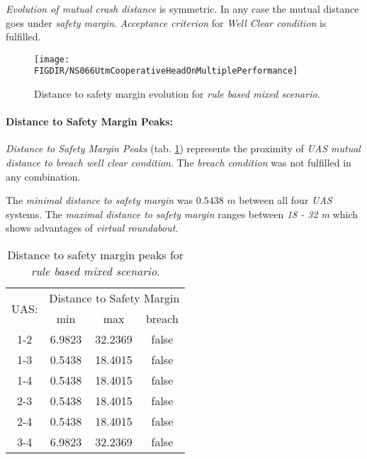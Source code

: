     \begin{note}
        \emph{Evolution of mutual crash distance} is symmetric. In any case the mutual distance goes under \emph{safety margin}. \emph{Acceptance criterion} for \emph{Well Clear condition} is fulfilled.
    \end{note}
        
    \begin{figure}[H]
        \centering
        \texttt{[image: \\FIGDIR/NS066UtmCooperativeHeadOnMultiplePerformance]}
        \caption{Distance to safety margin evolution for \emph{rule based mixed scenario}.}
        \label{fig:testRuleBasedMultipleAvoidancePerformance}
    \end{figure}
    
\paragraph{Distance to Safety Margin Peaks:} \emph{Distance to Safety Margin Peaks} (tab. \ref{tab:testCaseRuleBasedMixedSafetyMarginDistances}) represents the proximity of \emph{UAS mutual distance to breach well clear condition}. The \emph{breach condition} was not fulfilled in any combination. 
    
    The \emph{minimal distance to safety margin} was $0.5438$ $m$ between all four \emph{UAS} systems. The \emph{maximal distance to safety margin} ranges between \emph{18 - 32 m} which shows advantages of \emph{virtual roundabout}.
    
    \begin{table}[H]
        \centering
        \begin{tabular}{c||c|c|c}
            \multirow{2}{*}{UAS:} & \multicolumn{3}{c}{Distance to Safety Margin} \\ \cline{2-4} 
                      & min          & max         & breach         \\ \hline\hline
                1-2   & 6.9823       & 32.2369     & false          \\ \hline
                1-3   & 0.5438       & 18.4015     & false          \\ \hline
                1-4   & 0.5438       & 18.4015     & false          \\ \hline
                2-3   & 0.5438       & 18.4015     & false          \\ \hline
                2-4   & 0.5438       & 18.4015     & false          \\ \hline
                3-4   & 6.9823       & 32.2369     & false          \\ 
        \end{tabular}
        \caption{Distance to safety margin peaks for \emph{rule based mixed scenario}.}
        \label{tab:testCaseRuleBasedMixedSafetyMarginDistances}
    \end{table}
    
